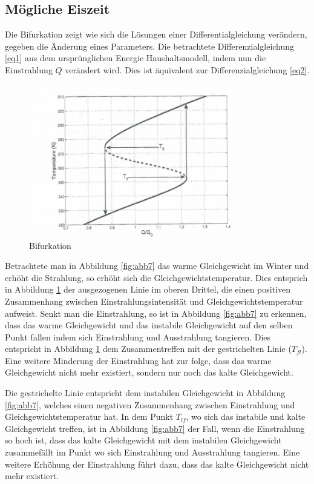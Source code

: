\begin{refsection}
\subsection{Mögliche Eiszeit} \label{sec:bi}
Die Bifurkation zeigt wie sich die Lösungen einer Differentialgleichung
verändern, gegeben die Änderung eines Parameters. Die betrachtete
Differenzialgleichung \eqref{eq1} aus dem ursprünglichen Energie
Haushaltsmodell, indem nun die Einstrahlung $Q$ verändert wird.
Dies ist äquivalent zur Differenzialgleichung \eqref{eq2}.
%
\begin{figure}
	\centering
	\includegraphics[width= 0.8\textwidth]{neigung/Bifurkation.png}
	\caption[Bifurkation]{Bifurkation}
	\label{fig:abb8}
\end{figure}
%
Betrachtete man in Abbildung \ref{fig:abb7} das warme Gleichgewicht
im Winter und erhöht die Strahlung, so erhöht sich die
Gleichgewichtstemperatur. Dies entsprich in Abbildung \ref{fig:abb8}
der ausgezogenen Linie im oberen Drittel, die einen positiven
Zusammenhang zwischen Einstrahlungsintensität und Gleichgewichtstemperatur
aufweist. Senkt man die Einstrahlung, so ist in Abbildung \ref{fig:abb7}
zu erkennen, dass das warme Gleichgewicht und das instabile
Gleichgewicht auf den selben Punkt fallen indem sich Einstrahlung
und Ausstrahlung tangieren. Dies entspricht in Abbildung \ref{fig:abb8}
dem Zusammentreffen mit der gestrichelten Linie ($T_{fl}$). Eine
weitere Minderung der Einstrahlung hat zur folge, dass das warme
Gleichgewicht nicht mehr existiert, sondern nur noch das kalte
Gleichgewicht.

Die gestrichelte Linie entspricht dem instabilen Gleichgewicht in
Abbildung \ref{fig:abb7}, welches einen negativen Zusammenhang
zwischen Einstrahlung und Gleichgewichtstemperatur hat. In dem Punkt
$T_{lf}$, wo sich das instabile und kalte Gleichgewicht treffen,
ist in Abbildung \ref{fig:abb7} der Fall, wenn die Einstrahlung so
hoch ist, dass das kalte Gleichgewicht mit dem instabilen Gleichgewicht
zusammefällt im Punkt wo sich Einstrahlung und Ausstrahlung tangieren.
Eine weitere Erhöhung der Einstrahlung führt dazu, dass das kalte
Gleichgewicht nicht mehr existiert.


\end{refsection}
